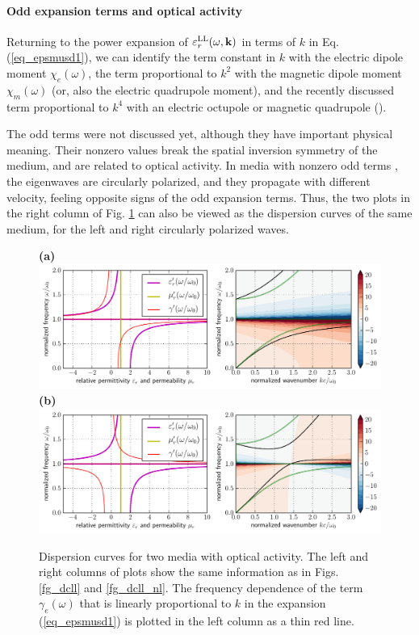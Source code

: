 \paragraph{Odd expansion terms and optical activity }   %
Returning to the power expansion of $\varepsilon_r^\text{LL}(\omega, {\mathbf{k}})$ in terms of $k$ in Eq. (\ref{eq_epsmusd1}), we can identify the term constant in $k$ with the electric dipole moment $\chi_e(\omega)$, the term proportional to $k^2$ with the magnetic dipole moment $\chi_m(\omega)$ (or, also the electric quadrupole moment), and the recently discussed term proportional to $k^4$ with an electric octupole or magnetic quadrupole (\cite{agranovich2006spatial, agranovich2004linear, krowne2007book}).

The odd terms were not discussed yet, although they have important physical meaning. Their nonzero values break the spatial inversion symmetry of the medium, and are related to optical activity. In media with nonzero odd terms
, the eigenwaves are circularly polarized, and they propagate with different velocity, feeling opposite signs of the odd expansion terms. Thus, the two plots in the right column of Fig. \ref{fg_dcllactivity} can also be viewed as the dispersion curves of the same medium, for the left and right circularly polarized waves.

\begin{figure}[t] \caption{Dispersion curves for two media with optical activity. The left and right columns of plots show the same information as in Figs. \ref{fg_dcll} and \ref{fg_dcll_nl}. The frequency dependence of the term $\gamma_e(\omega)$ that is linearly proportional to $k$ in the expansion (\ref{eq_epsmusd1}) is plotted in the left column as a thin red line. } \label{fg_dcllactivity} \centering  
\textbf{(a)}\\\includegraphics[width=1\textwidth]{img/dispersion_landau_lifshitz/dispersion_ll_activep.pdf}
\textbf{(b)}\\\includegraphics[width=1\textwidth]{img/dispersion_landau_lifshitz/dispersion_ll_activen.pdf}
\end{figure}

